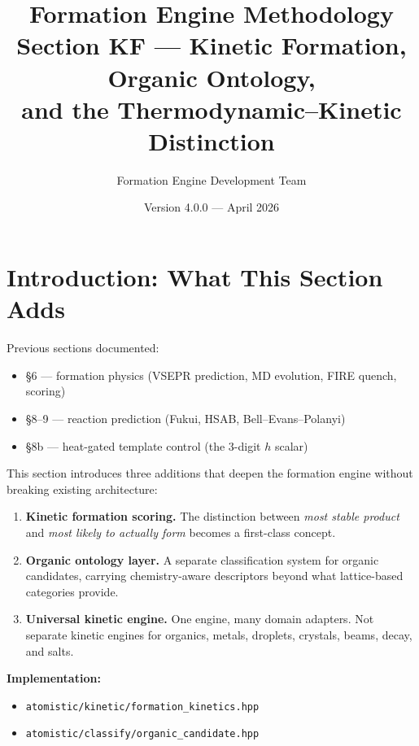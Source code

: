 \documentclass[11pt]{article}
\title{\textbf{Formation Engine Methodology} \\
\Large Section KF --- Kinetic Formation, Organic Ontology, \\
and the Thermodynamic--Kinetic Distinction}
\author{Formation Engine Development Team}
\date{Version 4.0.0 --- April 2026}
\begin{document}
\maketitle
\tableofcontents

\section{Introduction: What This Section Adds}
\label{sec:intro}

Previous sections documented:

\begin{itemize}[leftmargin=2em]
  \item \S6 --- formation physics (VSEPR prediction, MD evolution, FIRE quench, scoring)
  \item \S8--9 --- reaction prediction (Fukui, HSAB, Bell--Evans--Polanyi)
  \item \S8b --- heat-gated template control (the 3-digit $h$ scalar)
\end{itemize}

This section introduces three additions that deepen the formation engine
without breaking existing architecture:

\begin{enumerate}[leftmargin=2em]
  \item \textbf{Kinetic formation scoring.}
        The distinction between \emph{most stable product} and
        \emph{most likely to actually form} becomes a first-class concept.
  \item \textbf{Organic ontology layer.}
        A separate classification system for organic candidates, carrying
        chemistry-aware descriptors beyond what lattice-based categories provide.
  \item \textbf{Universal kinetic engine.}
        One engine, many domain adapters.  Not separate kinetic engines for
        organics, metals, droplets, crystals, beams, decay, and salts.
\end{enumerate}

\textbf{Implementation:}
\begin{itemize}[leftmargin=2em]
  \item \texttt{atomistic/kinetic/formation\_kinetics.hpp}
  \item \texttt{atomistic/classify/organic\_candidate.hpp}
\end{itemize}
\end{document}
